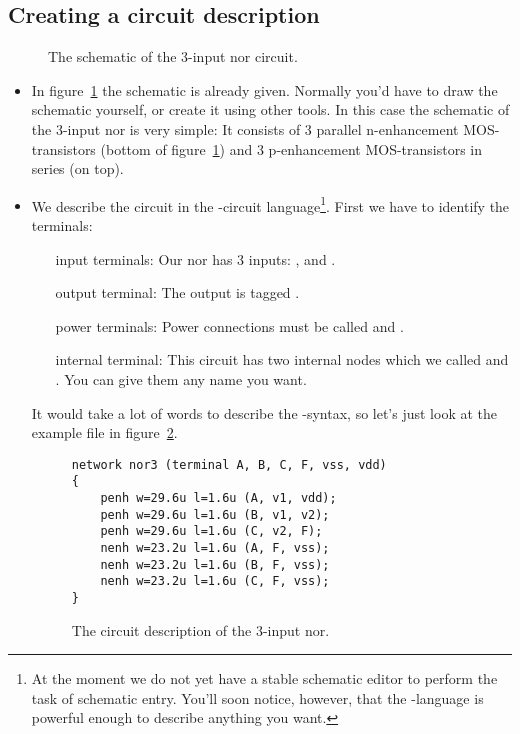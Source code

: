 \subsection{Creating a circuit description}
\begin{figure}
\centerline{}
\caption{The schematic of the 3-input nor circuit.}
\label{nor3}
\end{figure}
\begin{itemize}
\item
In figure~\ref{nor3} the schematic is already given. Normally you'd
have to draw the schematic yourself, or create it using other tools.
In this case the schematic of the 3-input nor is very simple: It
consists of 3 parallel n-enhancement MOS-transistors (bottom of
figure~\ref{nor3}) and 3 p-enhancement MOS-transistors in series (on top).
\item
We describe the circuit in the -circuit
language\footnote{At
the moment we do not yet have a stable schematic editor to perform
the task of schematic entry. You'll soon notice, however, that the
-language is powerful enough to describe anything you
want.}.
First we have to identify the terminals:
\begin{itemize}
\item[input terminals:]
Our nor has 3 inputs: ,  and .
\item[output terminal:]
The output is tagged .
\item[power terminals:]
Power connections must be called  and .
\item[internal terminal:]
This circuit has two internal nodes which we called  and
. You can give them any name you want.
\end{itemize}
It would take a lot of words to describe the -syntax, so
let's just look at the example file in figure~\ref{tut-nor3}.
\begin{figure}
\begin{verbatim}
network nor3 (terminal A, B, C, F, vss, vdd)
{
    penh w=29.6u l=1.6u (A, v1, vdd);
    penh w=29.6u l=1.6u (B, v1, v2);
    penh w=29.6u l=1.6u (C, v2, F);
    nenh w=23.2u l=1.6u (A, F, vss);
    nenh w=23.2u l=1.6u (B, F, vss);
    nenh w=23.2u l=1.6u (C, F, vss);
}
\end{verbatim}
\caption{\label{tut-nor3}
The \protect{} circuit description of the 3-input nor.}

\end{figure}
\end{itemize}
